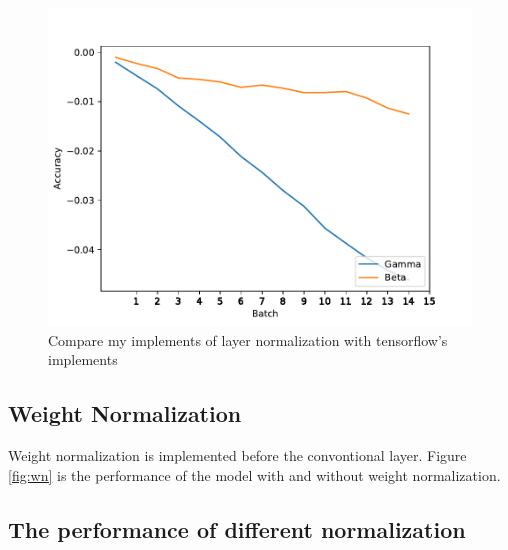 \documentclass{article}
\begin{document}
\begin{figure}[h]
\includegraphics[scale=0.8]{img/com_param_LN.pdf}
\caption{Compare my implements of layer normalization with tensorflow's implements}
\label{fig:com_ln_param}
\end{figure}

\subsection{Weight Normalization}
Weight normalization is implemented before the convontional layer. Figure \ref{fig:wn} is the performance of the model with and without weight normalization. %

\subsection{The performance of different normalization}
\end{document}
